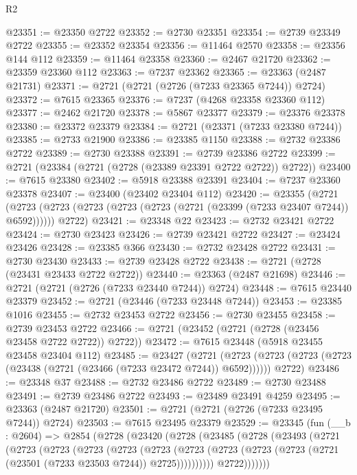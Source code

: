 \begin{lexlean}{R2}
\begin{coremodule}
@23351 := @23350 @2722
@23352 := @2730 @23351
@23354 := @2739 @23349 @2722
@23355 := @23352 @23354
@23356 := @11464 @2570
@23358 := @23356 @144 @112
@23359 := @11464 @23358
@23360 := @2467 @21720
@23362 := @23359 @23360 @112
@23363 := @7237 @23362
@23365 := @23363 (@2487 @21731)
@23371 := @2721 (@2721 (@2726 (@7233 @23365 @7244)) @2724)
@23372 := @7615 @23365
@23376 := @7237 (@4268 @23358 @23360 @112)
@23377 := @2462 @21720
@23378 := @5867 @23377
@23379 := @23376 @23378
@23380 := @23372 @23379
@23384 := @2721 (@23371 (@7233 @23380 @7244))
@23385 := @2733 @21900
@23386 := @23385 @1150
@23388 := @2732 @23386 @2722
@23389 := @2730 @23388
@23391 := @2739 @23386 @2722
@23399 := @2721 (@23384 (@2721 (@2728 (@23389 @23391 @2722 @2722)) @2722))
@23400 := @7615 @23380
@23402 := @5918 @23388 @23391
@23404 := @7237 @23360 @23378
@23407 := @23400 (@23402 @23404 @112)
@23420 := @23355
    (@2721
      (@2723 (@2723 (@2723 (@2723 (@2723 (@2721 (@23399 (@7233 @23407 @7244)) @6592))))))
      @2722)
@23421 := @23348 @22
@23423 := @2732 @23421 @2722
@23424 := @2730 @23423
@23426 := @2739 @23421 @2722
@23427 := @23424 @23426
@23428 := @23385 @366
@23430 := @2732 @23428 @2722
@23431 := @2730 @23430
@23433 := @2739 @23428 @2722
@23438 := @2721 (@2728 (@23431 @23433 @2722 @2722))
@23440 := @23363 (@2487 @21698)
@23446 := @2721 (@2721 (@2726 (@7233 @23440 @7244)) @2724)
@23448 := @7615 @23440 @23379
@23452 := @2721 (@23446 (@7233 @23448 @7244))
@23453 := @23385 @1016
@23455 := @2732 @23453 @2722
@23456 := @2730 @23455
@23458 := @2739 @23453 @2722
@23466 := @2721 (@23452 (@2721 (@2728 (@23456 @23458 @2722 @2722)) @2722))
@23472 := @7615 @23448 (@5918 @23455 @23458 @23404 @112)
@23485 := @23427
    (@2721
      (@2723 (@2723 (@2723 (@2723 (@23438 (@2721 (@23466 (@7233 @23472 @7244)) @6592))))))
      @2722)
@23486 := @23348 @37
@23488 := @2732 @23486 @2722
@23489 := @2730 @23488
@23491 := @2739 @23486 @2722
@23493 := @23489 @23491 @4259
@23495 := @23363 (@2487 @21720)
@23501 := @2721 (@2721 (@2726 (@7233 @23495 @7244)) @2724)
@23503 := @7615 @23495 @23379
@23529 := @23345
    (fun (__b : @2604) =>
    @2854
      (@2728
        (@23420
          (@2728
            (@23485
              (@2728
                (@23493
                  (@2721
                    (@2723
                      (@2723
                        (@2723
                          (@2723
                            (@2723
                              (@2723
                                (@2723
                                  (@2723 (@2723 (@2721 (@23501 (@7233 @23503 @7244)) @2725))))))))))
                    @2722)))))))

\end{coremodule}
\end{lexlean}
